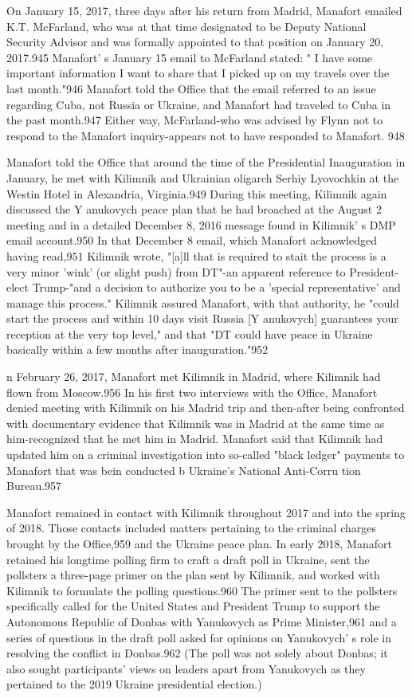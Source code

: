 On January 15,  2017, three days after his return from Madrid,  Manafort emailed K.T. McFarland, who was at that time designated to be Deputy National Security Advisor and was formally appointed to that position on January 20, 2017.945 Manafort' s  January 15 email to McFarland stated: " I  have some important information I  want to share that I picked up on my travels over the last month."946 Manafort told the Office that the email referred to an issue regarding Cuba, not Russia or Ukraine, and Manafort had traveled to Cuba in the past month.947 Either way, McFarland-who was advised by Flynn not to respond to the Manafort inquiry-appears not to have responded to Manafort. 948

Manafort told the Office that around the time of the Presidential Inauguration in January, he met with Kilimnik and Ukrainian oligarch Serhiy Lyovochkin at the Westin Hotel  in Alexandria, Virginia.949 During this meeting, Kilimnik again discussed the Y anukovych peace plan that he had broached at the August 2 meeting and in a  detailed December 8, 2016 message found in Kilimnik' s  DMP email account.950 In that December 8 email,  which Manafort acknowledged having read,951 Kilimnik wrote, "[a]ll that is required to stait the process is a very minor 'wink' (or slight push) from DT"-an apparent reference to President-elect Trump-"and a  decision to authorize you to be a  'special representative' and manage this process." Kilimnik assured Manafort, with that authority, he "could start the process and within 10 days visit Russia [Y anukovych] guarantees your reception at the very top level,"  and that "DT could have peace in Ukraine basically within a few months after inauguration."952

n February 26, 2017, Manafort met Kilimnik in Madrid, where Kilimnik had flown from Moscow.956 In his first two interviews with the Office, Manafort denied meeting with Kilimnik on his Madrid trip and then-after being confronted with documentary evidence that Kilimnik was in Madrid at the same time as him-recognized that he met him in Madrid.  Manafort said that Kilimnik had updated him on a  criminal investigation into so-called "black ledger" payments to Manafort that was bein conducted b Ukraine's National Anti-Corru tion Bureau.957

Manafort remained in contact with Kilimnik throughout 2017 and into the spring of 2018. Those contacts included matters pertaining to the criminal charges brought by the Office,959 and the Ukraine peace plan. In early 2018, Manafort retained his longtime polling firm to craft a  draft poll in Ukraine, sent the pollsters a  three-page primer on the plan sent by Kilimnik,  and worked with Kilimnik to formulate the polling questions.960 The primer sent to the pollsters specifically called for the United States and President Trump to support the Autonomous Republic of Donbas with Yanukovych as Prime Minister,961 and a series of questions in the draft poll asked for opinions on Yanukovych' s  role in resolving the conflict in Donbas.962 (The poll was not solely about Donbas; it also sought participants' views on leaders apart from Yanukovych as they pertained to the 2019 Ukraine presidential election.)


